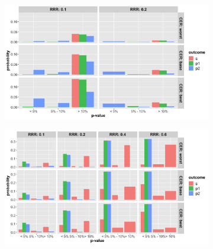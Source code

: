 \documentclass[]{article}
\begin{document}
\begin{figure}
\centering
  \caption{Probability that the p-value (from Fisher’s exact test) at termination of the trial is below 5\%, between 5\%
  and 10\% and greater than 10\% for cases where trial was (a) stopped for futility; (b) stopped for superiority. The
  rows represent the three control even rate scenarios and the three columns present the three relative risk reduction
  scenarios. Note: the denominator in each figure is the number of simulations (not the number of trials stopped for
  futility (a) or superiority (b), and thus, the proportions do not add up to 100\% within one figure. Further, (a) and
  (b) do not include simulations where the trial went to the max. allowed sample size. The bars should be interpreted
  with respect to the relative proportion that fit in each category.}
  \begin{subfigure}{0.8\textwidth}
    \centering
    \caption{}
    \includegraphics{../p1_plots/batch_size_nb_3000/pvalue_fut_p1.png}
  \end{subfigure}
  \bigbreak
  \begin{subfigure}{0.8\textwidth}
    \centering
    \caption{}
    \includegraphics{../p1_plots/batch_size_nb_3000/pvalue_sup_p1.png}
  \end{subfigure}
\end{figure}
\end{document}

